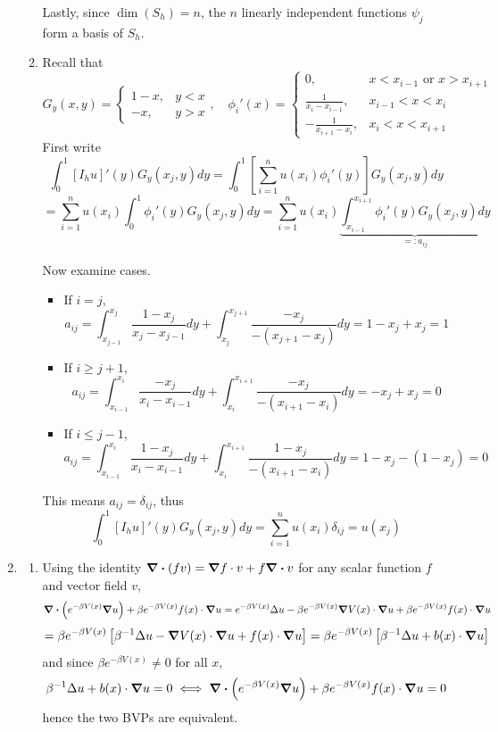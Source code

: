 \documentclass{article}
\newcommand{\sbr}[1]{\left[#1\right]}
\newcommand{\inv}{^{-1}}
\begin{document}
\begin{enumerate}
\begin{enumerate}
	Lastly, since $\dim(S_h)=n$, the $n$ linearly independent functions $\psi_j$ form a basis of $S_h$.
	
	
	\item Recall that
	$$G_y(x,y) =
	\begin{cases}
		1-x, & y<x\\
		-x, & y>x
	\end{cases},
	\quad \phi_i'(x) =
	\begin{cases}
		0, & x<x_{i-1} \text{ or } x>x_{i+1}\\
		\frac{1}{x_i-x_{i-1}}, & x_{i-1}<x<x_i\\
		-\frac{1}{x_{i+1}-x_i}, & x_i<x<x_{i+1}
	\end{cases}$$
	First write
	$$\int_0^1 [I_hu]'(y)G_y(x_j,y)dy
	= \int_0^1 \sbr{\sum_{i=1}^n u(x_i)\phi_i'(y)}G_y(x_j,y)dy$$
	$$= \sum_{i=1}^n u(x_i)\int_0^1 \phi_i'(y)G_y(x_j,y)dy
	= \sum_{i=1}^n u(x_i)\underbrace{\int_{x_{i-1}}^{x_{i+1}} \phi_i'(y)G_y(x_j,y)dy}_{=:a_{ij}}$$
	
	Now examine cases.
	\begin{itemize}
		
		\item If $i=j$,
		$$a_{ij} = \int_{x_{j-1}}^{x_j}\frac{1-x_j}{x_j-x_{j-1}}dy + \int_{x_j}^{x_{j+1}}\frac{-x_j}{-(x_{j+1}-x_j)}dy
		= 1 - x_j + x_j
		= 1$$
		
		\item If $i\ge j+1$,
		$$a_{ij} = \int_{x_{i-1}}^{x_i}\frac{-x_j}{x_i-x_{i-1}}dy + \int_{x_i}^{x_{i+1}}\frac{-x_j}{-(x_{i+1}-x_i)}dy
		= -x_j + x_j
		= 0$$
		
		\item If $i\le j-1$,
		$$a_{ij} = \int_{x_{i-1}}^{x_i}\frac{1-x_j}{x_i-x_{i-1}}dy + \int_{x_i}^{x_{i+1}}\frac{1-x_j}{-(x_{i+1}-x_i)}dy
		= 1 - x_j - (1 - x_j)
		= 0$$	
		
	\end{itemize}
	This means $a_{ij}=\delta_{ij}$, thus
	$$\int_0^1 [I_hu]'(y)G_y(x_j,y)dy = \sum_{i=1}^n u(x_i)\delta_{ij} = u(x_j)$$

\end{enumerate}



\item

\begin{enumerate}
	
	\item Using the identity $\div(fv)=\grad f\cdot v+f\div v$ for any scalar function $f$ and vector field $v$,
	$$\div(e^{-\beta V(x)}\grad u) + \beta e^{-\beta V(x)}f(x)\cdot\grad u
	= e^{-\beta V(x)}\Delta u - \beta e^{-\beta V(x)}\grad V(x)\cdot\grad u + \beta e^{-\beta V(x)}f(x)\cdot\grad u$$
	$$= \beta e^{-\beta V(x)}\sbr{\beta\inv\Delta u - \grad V(x)\cdot\grad u + f(x)\cdot\grad u}
	= \beta e^{-\beta V(x)}\sbr{\beta\inv\Delta u + b(x)\cdot\grad u}$$
	and since $\beta e^{-\beta V(x)}\ne0$ for all $x$,
	$$\beta\inv\Delta u + b(x)\cdot\grad u = 0
	\iff \div(e^{-\beta V(x)}\grad u) + \beta e^{-\beta V(x)}f(x)\cdot\grad u = 0$$
	hence the two BVPs are equivalent.
	

\end{enumerate}
\end{enumerate}
\end{document}
